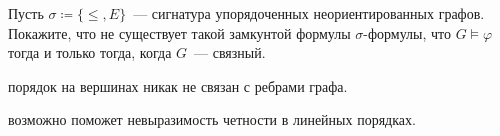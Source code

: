 Пусть $\sigma \coloneqq \{\le, E\}$~--- сигнатура упорядоченных неориентированных графов. Покажите, что
не существует такой замкунтой формулы $\sigma$-формулы, что $G \models \varphi$ тогда и только тогда,
когда $G$~--- связный.

 порядок на вершинах никак не связан с ребрами графа.

 возможно поможет невыразимость четности в линейных порядках.
